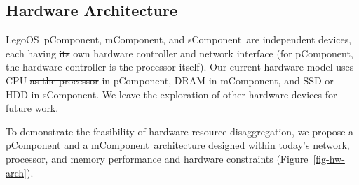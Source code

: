 \documentclass[10pt,times,twocolumn]{z2-article}
\renewcommand{\em}{\it}
\newcommand{\figWidth}{\columnwidth}
\newcommand{\beforecaption}{\vspace{-.15cm}\begin{spacing}{0.85}}
\newcommand{\aftercaption}{\vspace{-.45cm}\end{spacing}}
\newcommand{\mycaption}[3]{\beforecaption\caption{\label{#1}{\bf\footnotesize #2} \em\scriptsize #3}\aftercaption}
\newcommand{\splitkernel}{splitkernel}
\newcommand{\lego}{LegoOS}
\newcommand{\pcomponent}{pComponent}
\newcommand{\mcomponent}{mComponent}
\newcommand{\scomponent}{sComponent}
\providecommand{\DIFaddtex}[1]{{\protect\color{blue}\uwave{#1}}} %
\providecommand{\DIFdeltex}[1]{{\protect\color{red}\sout{#1}}}                      %
\providecommand{\DIFaddbegin}{} %
\providecommand{\DIFaddend}{} %
\providecommand{\DIFdelbegin}{} %
\providecommand{\DIFdelend}{} %
\providecommand{\DIFdelFL}[1]{\DIFdel{#1}} %
\providecommand{\DIFadd}[1]{\texorpdfstring{\DIFaddtex{#1}}{#1}} %
\providecommand{\DIFdel}[1]{\texorpdfstring{\DIFdeltex{#1}}{}} %
\newcommand{\DIFscaledelfig}{0.5}
\newlength{\DIFdelgraphicswidth} %
\newlength{\DIFdelgraphicsheight} %
\newcommand{\DIFaddincludegraphics}[2][]{{\color{blue}\fbox{\DIFOincludegraphics[#1]{#2}}}} %
\newcommand{\DIFdelincludegraphics}[2][]{%
\sbox{\DIFdelgraphicsbox}{\DIFOincludegraphics[#1]{#2}}%
\settoboxwidth{\DIFdelgraphicswidth}{\DIFdelgraphicsbox} %
\settoboxtotalheight{\DIFdelgraphicsheight}{\DIFdelgraphicsbox} %
\scalebox{\DIFscaledelfig}{%
\parbox[b]{\DIFdelgraphicswidth}{\usebox{\DIFdelgraphicsbox}\\[-\baselineskip] \rule{\DIFdelgraphicswidth}{0em}}\llap{\resizebox{\DIFdelgraphicswidth}{\DIFdelgraphicsheight}{%
\setlength{\unitlength}{\DIFdelgraphicswidth}%
\begin{picture}(1,1)%
\thicklines\linethickness{2pt} %
{\color[rgb]{1,0,0}\put(0,0){\framebox(1,1){}}}%
{\color[rgb]{1,0,0}\put(0,0){\line( 1,1){1}}}%
{\color[rgb]{1,0,0}\put(0,1){\line(1,-1){1}}}%
\end{picture}%
}\hspace*{3pt}}} %
} %
\DeclareRobustCommand{\DIFaddbegin}{\DIFOaddbegin \let\includegraphics\DIFaddincludegraphics} %
\DeclareRobustCommand{\DIFaddend}{\DIFOaddend \let\includegraphics\DIFOincludegraphics} %
\DeclareRobustCommand{\DIFdelbegin}{\DIFOdelbegin \let\includegraphics\DIFdelincludegraphics} %
\DeclareRobustCommand{\DIFdelend}{\DIFOaddend \let\includegraphics\DIFOincludegraphics} %
\begin{document}
{{{{{{{{\DIFdelbegin %
\DIFdelFL{\hspace{0.05in}
}%

\DIFdelend \subsection{Hardware Architecture}
\label{sec:hardware}
\lego\ \pcomponent, \mcomponent, and \scomponent\ are independent devices,
each having \DIFdelbegin \DIFdel{its }\DIFdelend \DIFaddbegin \DIFadd{their }\DIFaddend own hardware controller and network interface (for \pcomponent, the hardware controller is the processor itself).
Our current hardware model uses CPU \DIFdelbegin \DIFdel{as the processor }\DIFdelend in \pcomponent, 
DRAM in \mcomponent, and SSD or HDD in \scomponent.
We leave the exploration of other hardware devices for future work.

To demonstrate the feasibility of hardware resource disaggregation,
we propose a \pcomponent{} and a \mcomponent\ architecture designed 
within today's network, processor, and memory performance and hardware constraints
(Figure~\ref{fig-hw-arch}).

}}}}}}}}
\end{document}
